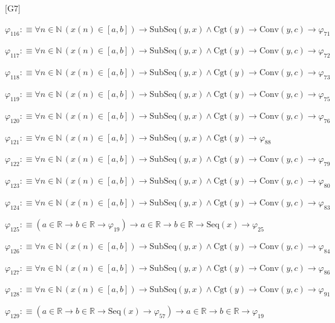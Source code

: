 \begin{fullproof}{[G7]}
\begin{abbrevlist}
\item $\varphi_{116} :\equiv \forall n \in \mathbb{N}\,(x(n) \in [a,b]) \to \mathrm{SubSeq}(y,x) \land \mathrm{Cgt}(y) \to \mathrm{Conv}(y,c) \to \varphi_{71}$
\item $\varphi_{117} :\equiv \forall n \in \mathbb{N}\,(x(n) \in [a,b]) \to \mathrm{SubSeq}(y,x) \land \mathrm{Cgt}(y) \to \mathrm{Conv}(y,c) \to \varphi_{72}$
\item $\varphi_{118} :\equiv \forall n \in \mathbb{N}\,(x(n) \in [a,b]) \to \mathrm{SubSeq}(y,x) \land \mathrm{Cgt}(y) \to \mathrm{Conv}(y,c) \to \varphi_{73}$
\item $\varphi_{119} :\equiv \forall n \in \mathbb{N}\,(x(n) \in [a,b]) \to \mathrm{SubSeq}(y,x) \land \mathrm{Cgt}(y) \to \mathrm{Conv}(y,c) \to \varphi_{75}$
\item $\varphi_{120} :\equiv \forall n \in \mathbb{N}\,(x(n) \in [a,b]) \to \mathrm{SubSeq}(y,x) \land \mathrm{Cgt}(y) \to \mathrm{Conv}(y,c) \to \varphi_{76}$
\item $\varphi_{121} :\equiv \forall n \in \mathbb{N}\,(x(n) \in [a,b]) \to \mathrm{SubSeq}(y,x) \land \mathrm{Cgt}(y) \to \varphi_{88}$
\item $\varphi_{122} :\equiv \forall n \in \mathbb{N}\,(x(n) \in [a,b]) \to \mathrm{SubSeq}(y,x) \land \mathrm{Cgt}(y) \to \mathrm{Conv}(y,c) \to \varphi_{79}$
\item $\varphi_{123} :\equiv \forall n \in \mathbb{N}\,(x(n) \in [a,b]) \to \mathrm{SubSeq}(y,x) \land \mathrm{Cgt}(y) \to \mathrm{Conv}(y,c) \to \varphi_{80}$
\item $\varphi_{124} :\equiv \forall n \in \mathbb{N}\,(x(n) \in [a,b]) \to \mathrm{SubSeq}(y,x) \land \mathrm{Cgt}(y) \to \mathrm{Conv}(y,c) \to \varphi_{83}$
\item $\varphi_{125} :\equiv (a \in \mathbb{R} \to b \in \mathbb{R} \to \varphi_{19}) \to a \in \mathbb{R} \to b \in \mathbb{R} \to \mathrm{Seq}(x) \to \varphi_{25}$
\item $\varphi_{126} :\equiv \forall n \in \mathbb{N}\,(x(n) \in [a,b]) \to \mathrm{SubSeq}(y,x) \land \mathrm{Cgt}(y) \to \mathrm{Conv}(y,c) \to \varphi_{84}$
\item $\varphi_{127} :\equiv \forall n \in \mathbb{N}\,(x(n) \in [a,b]) \to \mathrm{SubSeq}(y,x) \land \mathrm{Cgt}(y) \to \mathrm{Conv}(y,c) \to \varphi_{86}$
\item $\varphi_{128} :\equiv \forall n \in \mathbb{N}\,(x(n) \in [a,b]) \to \mathrm{SubSeq}(y,x) \land \mathrm{Cgt}(y) \to \mathrm{Conv}(y,c) \to \varphi_{91}$
\item $\varphi_{129} :\equiv (a \in \mathbb{R} \to b \in \mathbb{R} \to \mathrm{Seq}(x) \to \varphi_{57}) \to a \in \mathbb{R} \to b \in \mathbb{R} \to \varphi_{19}$

\end{abbrevlist}
\end{fullproof}
